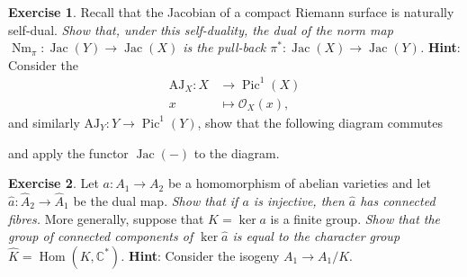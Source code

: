 \documentclass[12pt,a4paper]{amsbook}
\theoremstyle{remark} \newtheorem{rmk}[thm]{Remark}
\theoremstyle{definition} \newtheorem{defn}[thm]{Definition}
\theoremstyle{definition} \newtheorem{ex}[thm]{Example}
\theoremstyle{definition} \newtheorem{ej}{Exercise}
\let\emph\relax
\newcommand{\C}{\mathbb C}
\newcommand{\sO}{\mathscr O}
\DeclareMathOperator{\Hom}{Hom}
\DeclareMathOperator{\Pic}{Pic}
\DeclareMathOperator{\Jac}{Jac}
\DeclareMathOperator{\Nm}{Nm}
\begin{document}
\begin{ej}
Recall that the Jacobian of a compact Riemann surface is naturally self-dual. \textit{Show that, under this self-duality, the dual of the norm map $\Nm_\pi:\Jac(Y)\rightarrow \Jac(X)$ is the pull-back $\pi^*:\Jac(X) \rightarrow \Jac(Y)$.} \textbf{Hint}: Consider the \emph{Abel-Jacobi map}
\begin{align*}
  \mathrm{AJ}_X : X & \longrightarrow \Pic^1(X) \\
  x  & \longmapsto \sO_X(x),
\end{align*}
and similarly $\mathrm{AJ}_Y:Y\rightarrow \Pic^1(Y)$, show that the following diagram commutes
\begin{center}
\end{center}
and apply the functor $\Jac(-)$ to the diagram.
\end{ej}

\begin{ej}
Let $a:A_1 \rightarrow A_2$ be a homomorphism of abelian varieties and let $\hat{a}:\hat{A}_2 \rightarrow \hat{A}_1$ be the dual map. \textit{Show that if $a$ is injective, then $\hat{a}$ has connected fibres.} More generally, suppose that $K=\ker a$ is a finite group. \textit{Show that the group of connected components of $\ker \hat{a}$ is equal to the character group $\hat{K}=\Hom(K,\C^*)$.} \textbf{Hint}: Consider the isogeny $A_1\rightarrow A_1/K$.
\end{ej}
\end{document}
